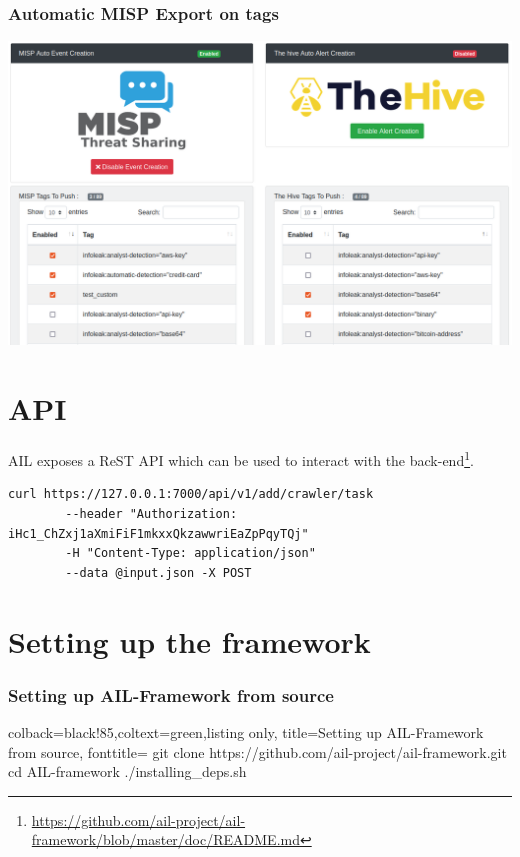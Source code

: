 \documentclass[aspectratio=169]{beamer}
\begin{document}
\begin{frame}
    \frametitle{Automatic MISP Export on tags}
    \centerline{\includegraphics[scale=0.25]{screenshot/tags_misp_auto.png}}
\end{frame}


\section{API}

\begin{frame}[fragile]
AIL exposes a ReST API which can be used to interact with the back-end\footnote{\url{https://github.com/ail-project/ail-framework/blob/master/doc/README.md}}.

        \begin{lstlisting}
curl https://127.0.0.1:7000/api/v1/add/crawler/task
        --header "Authorization: iHc1_ChZxj1aXmiFiF1mkxxQkzawwriEaZpPqyTQj"
        -H "Content-Type: application/json"
        --data @input.json -X POST
        \end{lstlisting}
\end{frame}

\section{Setting up the framework}
\lstset{style=bash}
\begin{frame}[fragile]
    \frametitle{Setting up AIL-Framework from source}
    \begin{tcblisting}{colback=black!85,coltext=green,listing only,
        title=Setting up AIL-Framework from source, fonttitle=\bfseries}
git clone https://github.com/ail-project/ail-framework.git
cd AIL-framework
./installing_deps.sh
\end{tcblisting}
\end{frame}
\end{document}
